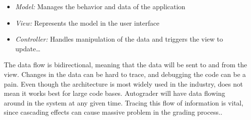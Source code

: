 \begin{itemize}  
\item \emph{Model:} Manages the behavior and data of the application
\item \emph{View:} Represents the model in the user interface
\item \emph{Controller:} Handles manipulation of the data and triggers the view to update\ldots 
\end{itemize}

The data flow is bidirectional, meaning that the data will be sent to and from the view. Changes in the data can be hard to trace, and debugging the code can be a pain. Even though the architecture is most widely used in the industry, does not mean it works best for large code bases. Autograder will have data flowing around in the system at any given time. Tracing this flow of information is vital, since cascading effects can cause massive problem in the grading process.. 
















